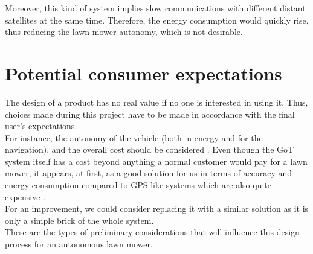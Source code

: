 \noindent
Moreover, this kind of system implies slow communications with different distant satellites at the same time. Therefore, the energy consumption would quickly rise, thus reducing the lawn mower autonomy, which is not desirable.

\section{Potential consumer expectations}
The design of a product has no real value if no one is interested in using it. Thus, choices made during this project have to be made in accordance with the final user's expectations.\\

\noindent
For instance, the autonomy of the vehicle (both in energy and for the navigation), and the overall cost should be considered . Even though the GoT system itself has a cost beyond anything a normal customer would pay for a lawn mower, it appears, at first, as a good solution for us in terms of accuracy and energy consumption compared to GPS-like systems which are also quite expensive . \\

\noindent
For an improvement, we could consider replacing it with a similar solution as it is only a simple brick of the whole system. \\

\noindent
These are the types of preliminary considerations that will influence this design process for an autonomous lawn mower.